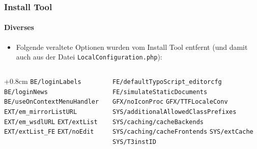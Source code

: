 
\begin{frame}[fragile]
	\frametitle{Install Tool}
	\framesubtitle{Diverses}

	\begin{itemize}
		\item Folgende veraltete Optionen wurden vom Install Tool entfernt\newline
			(und damit auch aus der Datei \texttt{LocalConfiguration.php}):
	\end{itemize}

	\begin{columns}[T]
		\begin{column}{.5\textwidth}
			\advance\leftskip+0.8cm
			\smaller
				\texttt{BE/loginLabels}\newline
				\texttt{BE/loginNews}\newline
				\texttt{BE/useOnContextMenuHandler}\newline
				\texttt{EXT/em\_mirrorListURL}\newline
				\texttt{EXT/em\_wsdlURL}\newline
				\texttt{EXT/extList}\newline
				\texttt{EXT/extList\_FE}\newline
				\texttt{EXT/noEdit}\newline
			\normalsize
		\end{column}
		\begin{column}{.5\textwidth}
			\smaller
				\texttt{FE/defaultTypoScript\_editorcfg}\newline
				\texttt{FE/simulateStaticDocuments}\newline
				\texttt{GFX/noIconProc}\newline
				\texttt{GFX/TTFLocaleConv}\newline
				\texttt{SYS/additionalAllowedClassPrefixes}\newline
				\texttt{SYS/caching/cacheBackends}\newline
				\texttt{SYS/caching/cacheFrontends}\newline
				\texttt{SYS/extCache}\newline
				\texttt{SYS/T3instID}\newline
			\normalsize
		\end{column}
	\end{columns}

\end{frame}


